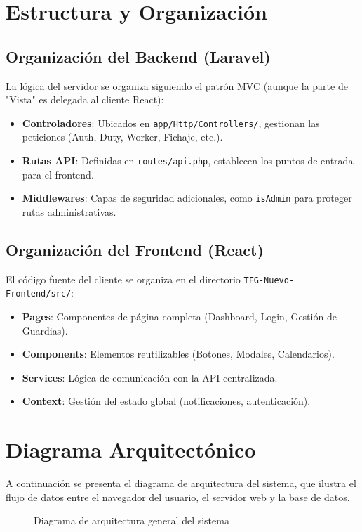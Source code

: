 \section{Estructura y Organización}

\subsection{Organización del Backend (Laravel)}
La lógica del servidor se organiza siguiendo el patrón MVC (aunque la parte de "Vista" es delegada al cliente React):
\begin{itemize}
    \item \textbf{Controladores}: Ubicados en \texttt{app/Http/Controllers/}, gestionan las peticiones (Auth, Duty, Worker, Fichaje, etc.).
    \item \textbf{Rutas API}: Definidas en \texttt{routes/api.php}, establecen los puntos de entrada para el frontend.
    \item \textbf{Middlewares}: Capas de seguridad adicionales, como \texttt{isAdmin} para proteger rutas administrativas.
\end{itemize}

\subsection{Organización del Frontend (React)}
El código fuente del cliente se organiza en el directorio \texttt{TFG-Nuevo-Frontend/src/}:
\begin{itemize}
    \item \textbf{Pages}: Componentes de página completa (Dashboard, Login, Gestión de Guardias).
    \item \textbf{Components}: Elementos reutilizables (Botones, Modales, Calendarios).
    \item \textbf{Services}: Lógica de comunicación con la API centralizada.
    \item \textbf{Context}: Gestión del estado global (notificaciones, autenticación).
\end{itemize}

\section{Diagrama Arquitectónico}
A continuación se presenta el diagrama de arquitectura del sistema, que ilustra el flujo de datos entre el navegador del usuario, el servidor web y la base de datos.

\begin{figure}[H]
    \centering
    \caption{Diagrama de arquitectura general del sistema}
    \label{fig:arquitectura-general}
\end{figure}